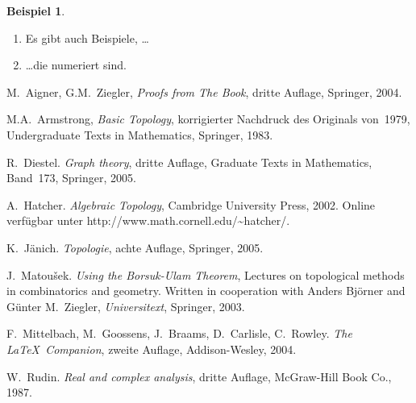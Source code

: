 \documentclass[a4paper,oneside,DIV8,10pt]{scrartcl}
\theoremstyle{definition}
\newtheorem{beispiel}[satz]{Beispiel}
\begin{document}
  \begin{beispiel}
    \hfil
    \begin{enumerate}
      \item Es gibt auch Beispiele, \dots
      \item \dots die numeriert sind.
    \end{enumerate}
  \end{beispiel}



  \begin{thebibliography}{99}
     M.~Aigner, G.M.~Ziegler, \emph{Proofs from The
        Book}, dritte Auflage, Springer, 2004.

     M.A.~Armstrong, \emph{Basic Topology},
      korrigierter Nachdruck des Originals von~1979, 
      Undergraduate Texts in Mathematics, Springer, 1983.

     R.~Diestel. \emph{Graph theory}, dritte Auflage, 
      Graduate Texts in Mathematics, Band~173, Springer, 2005.

     A.~Hatcher. \emph{Algebraic Topology}, 
      Cambridge University Press, 2002. 
      Online verf\"ugbar unter
      \textsf{http://www.math.cornell.edu/\~{}hatcher/}.

     K.~J\"anich. \emph{Topologie}, achte Auflage,
      Springer, 2005.

     J.~Matou\v sek. \emph{Using the Borsuk-Ulam
        Theorem}, Lectures on topological methods in combinatorics and
      geometry. Written in cooperation with Anders Bj\"orner and G\"unter
      M.~Ziegler, \emph{Universitext}, Springer, 2003.

     F.~Mittelbach, M.~Goossens, J.~Braams,
      D.~Carlisle, C.~Rowley. \emph{The \LaTeX\ Companion}, zweite
      Auflage, Addison-Wesley, 2004.

     W.~Rudin. \emph{Real and complex analysis}, dritte
      Auflage, McGraw-Hill Book Co., 1987.

  \end{thebibliography}

\end{document}
